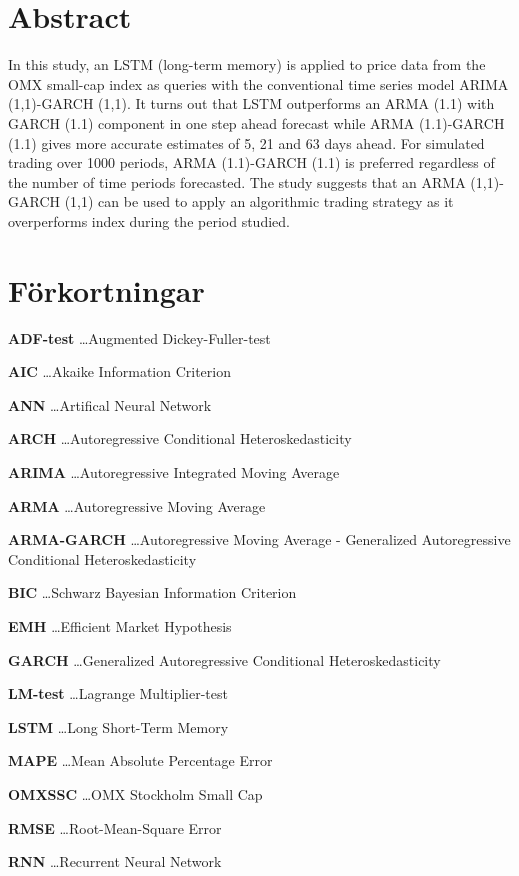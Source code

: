 \documentclass[11pt]{article}
\numberwithin{equation}{section}
\numberwithin{table}{section}
\numberwithin{figure}{section}
\begin{document}
\section*{Abstract}
In this study, an LSTM (long-term memory) is applied to price data from the OMX small-cap index as queries with the conventional time series model ARIMA (1,1)-GARCH (1,1). It turns out that LSTM outperforms an ARMA (1.1) with GARCH (1.1) component in one step ahead forecast while ARMA (1.1)-GARCH (1.1) gives more accurate estimates of 5, 21 and 63 days ahead. For simulated trading over 1000 periods, ARMA (1.1)-GARCH (1.1) is preferred regardless of the number of time periods forecasted. The study suggests that an ARMA (1,1)-GARCH (1,1) can be used to apply an algorithmic trading strategy as it overperforms index during the period studied.


\newpage
\thispagestyle{empty}
\tableofcontents
\thispagestyle{empty}
\newpage

\newpage 
\thispagestyle{empty}

\section*{Förkortningar}
\textbf{ADF-test} \dots Augmented Dickey-Fuller-test \par
\textbf{AIC} \dots Akaike Information Criterion \par
\textbf{ANN} \dots Artifical Neural Network \par
\textbf{ARCH} \dots Autoregressive Conditional Heteroskedasticity \par
\textbf{ARIMA} \dots Autoregressive Integrated Moving Average \par
\textbf{ARMA} \dots Autoregressive Moving Average \par 
\textbf{ARMA-GARCH} \dots Autoregressive Moving Average - Generalized Autoregressive Conditional Heteroskedasticity \par 
\textbf{BIC} \dots Schwarz Bayesian Information Criterion \par
\textbf{EMH} \dots Efficient Market Hypothesis \par
\textbf{GARCH} \dots Generalized Autoregressive Conditional Heteroskedasticity \par
\textbf{LM-test} \dots Lagrange Multiplier-test \par
\textbf{LSTM} \dots Long Short-Term Memory \par
\textbf{MAPE} \dots Mean Absolute Percentage Error \par
\textbf{OMXSSC} \dots OMX Stockholm Small Cap \par
\textbf{RMSE} \dots Root-Mean-Square Error \par
\textbf{RNN} \dots Recurrent Neural Network \par
\end{document}
